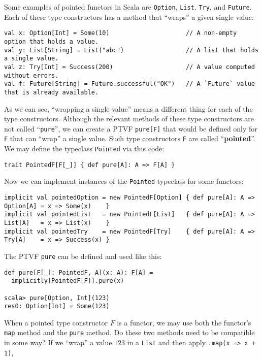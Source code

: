 Some examples of pointed functors in Scala are \lstinline!Option!,
\lstinline!List!, \lstinline!Try!, and \lstinline!Future!. Each
of these type constructors has a method that \textsf{``}wraps\textsf{''} a given single
value:
\begin{lstlisting}
val x: Option[Int] = Some(10)                     // A non-empty option that holds a value.
val y: List[String] = List("abc")                 // A list that holds a single value.
val z: Try[Int] = Success(200)                    // A value computed without errors.
val f: Future[String] = Future.successful("OK")   // A `Future` value that is already available.
\end{lstlisting}
As we can see, \textsf{``}wrapping a single value\textsf{''} means a different thing
for each of the type constructors. Although the relevant methods of
these type constructors are not called \textsf{``}\lstinline!pure!\textsf{''}, we
can create a PTVF \lstinline!pure[F]! that would be defined only
for \lstinline!F! that can \textsf{``}wrap\textsf{''} a single value. Such type constructors
\lstinline!F! are called \textsf{``}\textbf{pointed}\textsf{''}. We may define the
typeclass \lstinline!Pointed!
via this code:
\begin{lstlisting}
trait PointedF[F[_]] { def pure[A]: A => F[A] }
\end{lstlisting}
Now we can implement instances of the \lstinline!Pointed! typeclass
for some functors:
\begin{lstlisting}
implicit val pointedOption = new PointedF[Option] { def pure[A]: A => Option[A] = x => Some(x)    }
implicit val pointedList   = new PointedF[List]   { def pure[A]: A => List[A]   = x => List(x)    }
implicit val pointedTry    = new PointedF[Try]    { def pure[A]: A => Try[A]    = x => Success(x) }
\end{lstlisting}
The PTVF \lstinline!pure! can be defined and used like this:
\begin{lstlisting}
def pure[F[_]: PointedF, A](x: A): F[A] =
  implicitly[PointedF[F]].pure(x)

scala> pure[Option, Int](123)
res0: Option[Int] = Some(123)
\end{lstlisting}
When a pointed type constructor $F$ is a functor, we may use both
the functor\textsf{'}s \lstinline!map! method and the \lstinline!pure! method.
Do these two methods need to be compatible in some way? If we \textsf{``}wrap\textsf{''}
a value $123$ in a \lstinline!List! and then apply \lstinline!.map(x => x + 1)!,
